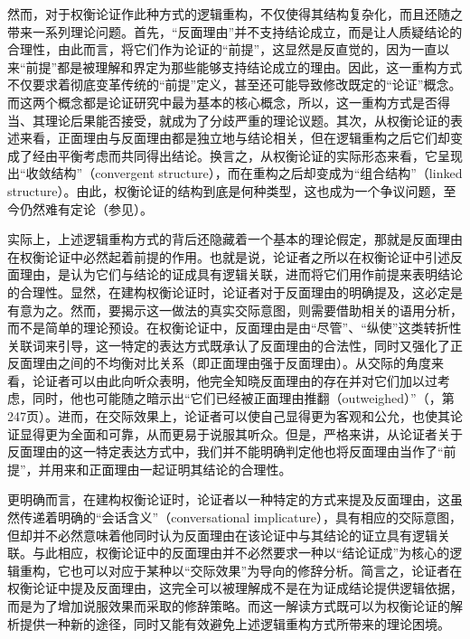\documentclass[b5paper,10.5pt,onecolumn,twoside,UTF8]{article}
\begin{document}
然而，对于权衡论证作此种方式的逻辑重构，不仅使得其结构复杂化，而且还随之带来一系列理论问题。首先，“反面理由”并不支持结论成立，而是让人质疑结论的合理性，由此而言，将它们作为论证的“前提”，这显然是反直觉的，因为一直以来“前提”都是被理解和界定为那些能够支持结论成立的理由。因此，这一重构方式不仅要求着彻底变革传统的“前提”定义，甚至还可能导致修改既定的“论证”概念。而这两个概念都是论证研究中最为基本的核心概念，所以，这一重构方式是否得当、其理论后果能否接受，就成为了分歧严重的理论议题。其次，从权衡论证的表述来看，正面理由与反面理由都是独立地与结论相关，但在逻辑重构之后它们却变成了经由平衡考虑而共同得出结论。换言之，从权衡论证的实际形态来看，它呈现出“收敛结构”（convergent structure），而在重构之后却变成为“组合结构”（linked structure）。由此，权衡论证的结构到底是何种类型，这也成为一个争议问题，至今仍然难有定论（参见\parencite{a16}）。

实际上，上述逻辑重构方式的背后还隐藏着一个基本的理论假定，那就是反面理由在权衡论证中必然起着前提的作用。也就是说，论证者之所以在权衡论证中引述反面理由，是认为它们与结论的证成具有逻辑关联，进而将它们用作前提来表明结论的合理性。显然，在建构权衡论证时，论证者对于反面理由的明确提及，这必定是有意为之。然而，要揭示这一做法的真实交际意图，则需要借助相关的语用分析，而不是简单的理论预设。在权衡论证中，反面理由是由“尽管”、“纵使”这类转折性关联词来引导，这一特定的表达方式既承认了反面理由的合法性，同时又强化了正反面理由之间的不均衡对比关系（即正面理由强于反面理由）。从交际的角度来看，论证者可以由此向听众表明，他完全知晓反面理由的存在并对它们加以过考虑，同时，他也可能随之暗示出“它们已经被正面理由推翻（outweighed）”（\parencite{a1}，第247页）。进而，在交际效果上，论证者可以使自己显得更为客观和公允，也使其论证显得更为全面和可靠，从而更易于说服其听众。但是，严格来讲，从论证者关于反面理由的这一特定表达方式中，我们并不能明确判定他也将反面理由当作了“前提”，并用来和正面理由一起证明其结论的合理性。

\indent 更明确而言，在建构权衡论证时，论证者以一种特定的方式来提及反面理由，这虽然传递着明确的“会话含义”（conversational implicature），具有相应的交际意图，但却并不必然意味着他同时认为反面理由在该论证中与其结论的证立具有逻辑关联。与此相应，权衡论证中的反面理由并不必然要求一种以“结论证成”为核心的逻辑重构，它也可以对应于某种以“交际效果”为导向的修辞分析。简言之，论证者在权衡论证中提及反面理由，这完全可以被理解成不是在为证成结论提供逻辑依据，而是为了增加说服效果而采取的修辞策略。而这一解读方式既可以为权衡论证的解析提供一种新的途径，同时又能有效避免上述逻辑重构方式所带来的理论困境。

\vspace{-0.5em}
\end{document}
